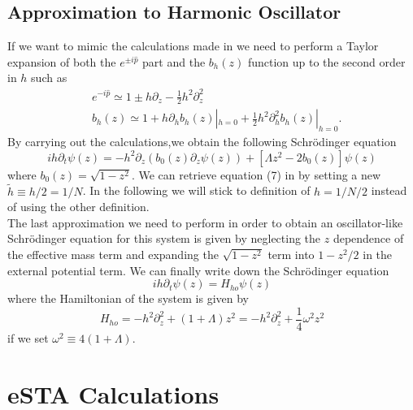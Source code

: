 \documentclass{article}
\begin{document}
\subsection{Approximation to Harmonic Oscillator}
If we want to mimic the calculations made in \cite{FastGenerationJulia2012} we need to perform a Taylor expansion of both the $ e^{\pm i\hat{p}} $ part and the $ b_{h}(z) $ function up to the second order in $ h $ such as
\begin{align}
	 & e^{-i\hat{p}}  \simeq 1 \pm h \partial_{z} - \frac{1}{2}h^2\partial^2_{z} \label{eq:TaylorExpansionExp }                         \\
	 & b_{h}(z) \simeq  1 + h \partial_{h}b_{h}(z)|_{h = 0} + \frac{1}{2}h^2\partial_h^2b_{h}(z)|_{h = 0} \label{eq:TaylorExpansionB }.
\end{align}
By carrying out the calculations,we obtain the following Schr{\"o}dinger equation
\begin{equation}
	\label{eq:TaylorExpansionHamiltonian}
	ih\partial_t\psi(z) =
	-h^2\partial_z\left(b_{0}(z)\partial_z\psi(z) \right)+
	\left[ 	\Lambda z^2 - 2b_{0}(z) \right] \psi(z)
\end{equation}
where $ b_{0}(z) = \sqrt{1-z^2}  $.
We can retrieve equation (7) in \cite{FastGenerationJulia2012} by setting a new $ \tilde{h} \equiv h/2 = 1/N $.
In the following we will stick to definition of $ h = 1/N/2 $ instead of using the other definition.\\
The last approximation we need to perform in order to obtain an oscillator-like Schr{\"o}dinger equation for this system is given by neglecting the $ z $ dependence of the effective mass term and expanding the $ \sqrt{1 - z^2}  $ term into $ 1 - z^2/2 $ in the external potential term. We can finally write down the Schr{\"o}dinger equation
\begin{equation}
	\label{eq:SchrodingerEquationHarmonicLike}
	ih\partial_t\psi(z) = H_{ho}\psi(z)
\end{equation}
where the Hamiltonian of the system is given by
\begin{equation}
	\label{eq:HamiltonianJosephsonJunctionHarmonic}
	H_{ho} = -h^2\partial_z^2 + (1 + \Lambda)z^2  =
	-h^2\partial_z^2 + \frac{1}{4}\omega^2 z^2
\end{equation}
if we set $ \omega^2 \equiv 4(1+\Lambda) $.
\section{eSTA Calculations}
\end{document}
